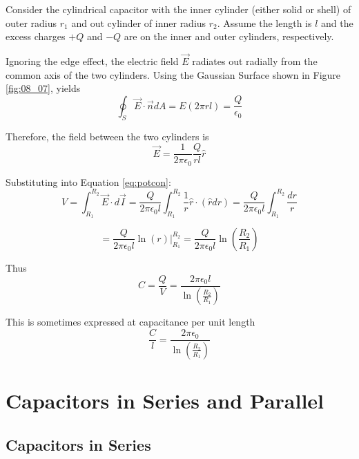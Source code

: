 \documentclass[14pt]{memoir}
\begin{document}
Consider the cylindrical capacitor with the inner cylinder (either solid or shell) of outer radius $r_1$ and out cylinder of inner radius $r_2$. Assume the length is $l$ and the excess charges $+Q$ and $-Q$ are on the inner and outer cylinders, respectively.

Ignoring the edge effect, the electric field $\vec{E}$ radiates out radially from the common axis of the two cylinders. Using the Gaussian Surface shown in Figure \ref{fig:08_07}, yields
\begin{equation}
\oint_S \vec{E} \cdot \vec{n} dA = E(2 \pi r l) = \frac{Q}{\epsilon_0}
\end{equation} 

Therefore, the field between the two cylinders is
\begin{equation}
\vec{E} = \frac{1}{2 \pi \epsilon_0} \frac{Q}{r l} \hat{r}
\end{equation}

Substituting into Equation \ref{eq:potcon}:
\begin{equation}
V = \int_{R_1}^{R_2} \vec{E} \cdot d\vec{I} = \frac{Q}{2 \pi \epsilon_0 l} \int_{R_1}^{R_2} \frac{1}{r} \hat{r} \cdot (\hat{r} dr) = \frac{Q}{2 \pi \epsilon_0 l} \int_{R_1}^{R_2} \frac{dr}{r} 
\end{equation}

\begin{equation}
= \frac{Q}{2 \pi \epsilon_0 l} \ln{(r)}\bigg\rvert_{R_1}^{R_2} =  \frac{Q}{2 \pi \epsilon_0 l}  \ln{(\frac{R_2}{R_1})}
\end{equation}

Thus
\begin{equation}
C = \frac{Q}{V} = \frac{2 \pi \epsilon_0 l}{\ln{(\frac{R_2}{R_1})}}
\end{equation}

This is sometimes expressed at capacitance per unit length 
\begin{equation}
\frac{C}{l} = \frac{2 \pi \epsilon_0 }{\ln{(\frac{R_2}{R_1})}}
\end{equation}

\section{Capacitors in Series and Parallel}  

\subsection{Capacitors in Series}
\end{document}
